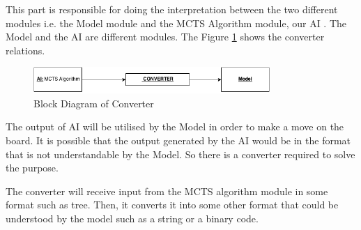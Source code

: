 This part is responsible for doing the interpretation between the two different modules i.e. the Model module and the MCTS Algorithm module, our AI . The Model and the AI are different modules. The Figure \ref{fig:flowchart} shows the converter relations.

\begin{figure}[H]
	\centering
	\includegraphics[width=0.80\textwidth]{2General_Architecture/2.2API/img/CONVERTER.png}
	\caption{Block Diagram of Converter}
	\label{fig:flowchart}
\end{figure}



The output of AI will be utilised by the Model in order to make a move on the board. It is possible that the output generated by the AI would be in the format that is not understandable by the Model. So there is a converter required to solve the purpose.

The converter will receive input from the MCTS algorithm module in some format such as tree. Then, it converts it into some other format that could be understood by the model such as a string or a binary code.

